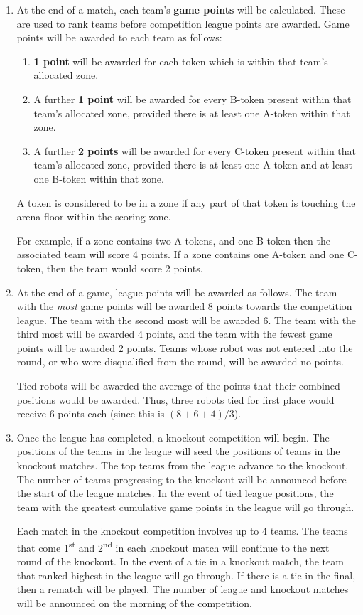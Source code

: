 \begin{enumerate}
\item At the end of a match, each team's \textbf{game points} will be calculated.  These are used to rank teams before competition league points are awarded.  Game points will be awarded to each team as follows:
  \begin{enumerate}
  \item \textbf{1 point} will be awarded for each token which is within that team's allocated zone.
  \item A further \textbf{1 point} will be awarded for every B-token present within that team's allocated zone, provided there is at least one A-token within that zone.
  \item A further \textbf{2 points} will be awarded for every C-token present within that team's allocated zone, provided there is at least one A-token and at least one B-token within that zone.
  \end{enumerate}
  A token is considered to be in a zone if any part of that token is touching the arena floor within the scoring zone.

  For example, if a zone contains two A-tokens, and one B-token then the associated team will score 4 points.  If a zone contains one A-token and one C-token, then the team would score 2 points.

\item At the end of a game, league points will be awarded as follows.
      The team with the \emph{most} game points will be awarded 8 points towards the competition league.
      The team with the second most will be awarded 6.
      The team with the third most will be awarded 4 points, and the team with the fewest game points will be awarded 2 points.
      Teams whose robot was not entered into the round, or who were disqualified from the round, will be awarded no points.

      Tied robots will be awarded the average of the points that their combined positions would be awarded.
      Thus, three robots tied for first place would receive 6 points each (since this is $(8+6+4)/3$).

\item Once the league has completed, a knockout competition will begin.
      The positions of the teams in the league will seed the positions of teams in the knockout matches.
      The top teams from the league advance to the knockout.
      The number of teams progressing to the knockout will be announced before the start of the league matches.
      In the event of tied league positions, the team with the greatest cumulative game points in the league will go through.

      Each match in the knockout competition involves up to 4 teams.
      The teams that come 1\textsuperscript{st} and 2\textsuperscript{nd} in each knockout match will continue to the next round of the knockout.
      In the event of a tie in a knockout match, the team that ranked highest in the league will go through.
      If there is a tie in the final, then a rematch will be played.
      The number of league and knockout matches will be announced on the morning of the competition.

\end{enumerate}
